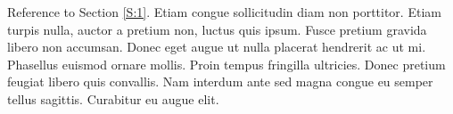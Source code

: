 \documentclass[preprint,12pt]{elsarticle}
\begin{document}
Reference to Section \ref{S:1}. Etiam congue sollicitudin diam non porttitor. Etiam turpis nulla, auctor a pretium non, luctus quis ipsum. Fusce pretium gravida libero non accumsan. Donec eget augue ut nulla placerat hendrerit ac ut mi. Phasellus euismod ornare mollis. Proin tempus fringilla ultricies. Donec pretium feugiat libero quis convallis. Nam interdum ante sed magna congue eu semper tellus sagittis. Curabitur eu augue elit.














\end{document}
